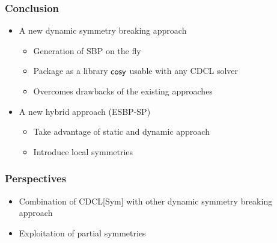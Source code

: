 \documentclass{beamer}
\begin{document}
\begin{frame}
\frametitle{Conclusion}
\begin{itemize}
	\item A new dynamic symmetry breaking approach
	\begin{itemize}
		\item Generation of SBP on the fly
		\item Package as a library $\textsf{cosy}$ usable with any CDCL solver
		\item Overcomes drawbacks of the existing approaches
	\end{itemize}

\vfill
	\item A new hybrid approach (ESBP-SP)

	\begin{itemize}
		\item Take advantage of static and dynamic approach
		\item Introduce local symmetries
	\end{itemize}
\end{itemize}

\end{frame}
\begin{frame}
\frametitle{Perspectives}
\begin{itemize}
	\item Combination of CDCL[Sym] with other dynamic symmetry breaking approach

	\vfill
	\item Exploitation of partial symmetries



\end{itemize}

\vfill
\flushright
{}
\end{frame}
\end{document}
